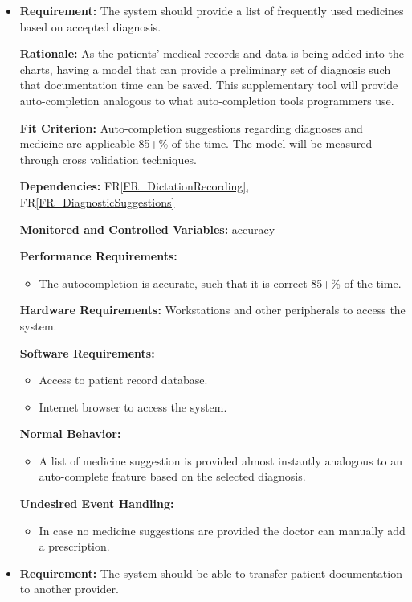 \documentclass[12pt]{article}
\newcounter{reqnum} %
\begin{document}
\begin{itemize}
\item[FR\refstepcounter{reqnum}\thereqnum \label{FR_medicalSuggestions}:] 

\textbf{Requirement:} The system should provide a list of frequently used medicines based on accepted diagnosis.

\textbf{Rationale:} As the patients' medical records and data is being added into the charts, having a model that can provide a preliminary set of diagnosis such that documentation time can be saved. This supplementary tool will provide auto-completion analogous to what auto-completion tools programmers use.

\textbf{Fit Criterion:} Auto-completion suggestions regarding diagnoses and medicine are applicable 85+\% of the time. The model will be measured through cross validation techniques.
 
\textbf{Dependencies:} FR\ref{FR_DictationRecording}, FR\ref{FR_DiagnosticSuggestions}

\textbf{Monitored and Controlled Variables:} accuracy

\textbf{Performance Requirements:}
\begin{itemize}
  \item The autocompletion is accurate, such that it is correct 85+\% of the time. 
\end{itemize}

\textbf{Hardware Requirements:} 
Workstations and other peripherals to access the system.

\textbf{Software Requirements:}
\begin{itemize}
  \item Access to patient record database.
  \item Internet browser to access the system. 
\end{itemize}

\textbf{Normal Behavior:}
\begin{itemize}
  \item A list of medicine suggestion is provided almost instantly analogous to an auto-complete feature based on the selected diagnosis.
\end{itemize}

\textbf{Undesired Event Handling:}
\begin{itemize}
  \item In case no medicine suggestions are provided the doctor can manually add a prescription.
\end{itemize}

\item[FR\refstepcounter{reqnum}\thereqnum \label{FR_transferPatient}:] 
\textbf{Requirement:} The system should be able to transfer patient documentation to another provider. 


\end{itemize}
\end{document}
